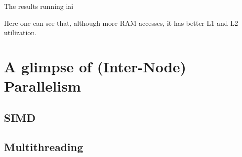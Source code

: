 \begin{listing}[H]
  \inputminted{text}{./assets/iai.txt}
\caption{The results running iai}
\end{listing}

Here one can see that, although more RAM accesses, it has better L1 and L2 utilization.

\section{A glimpse of (Inter-Node) Parallelism}
\subsection{SIMD}
\subsection{Multithreading}
